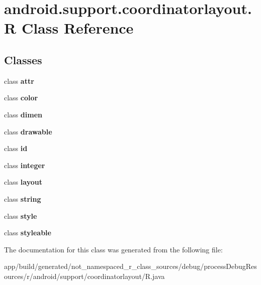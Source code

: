 \hypertarget{classandroid_1_1support_1_1coordinatorlayout_1_1_r}{}\section{android.\+support.\+coordinatorlayout.\+R Class Reference}
\label{classandroid_1_1support_1_1coordinatorlayout_1_1_r}
\subsection*{Classes}
\begin{DoxyCompactItemize}
\item 
class {\bfseries attr}
\item 
class {\bfseries color}
\item 
class {\bfseries dimen}
\item 
class {\bfseries drawable}
\item 
class {\bfseries id}
\item 
class {\bfseries integer}
\item 
class {\bfseries layout}
\item 
class {\bfseries string}
\item 
class {\bfseries style}
\item 
class {\bfseries styleable}
\end{DoxyCompactItemize}


The documentation for this class was generated from the following file\+:\begin{DoxyCompactItemize}
\item 
app/build/generated/not\+\_\+namespaced\+\_\+r\+\_\+class\+\_\+sources/debug/process\+Debug\+Resources/r/android/support/coordinatorlayout/R.\+java\end{DoxyCompactItemize}
